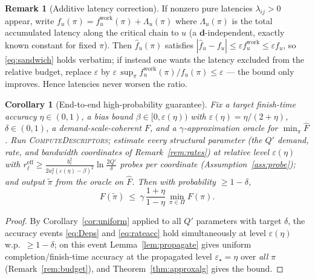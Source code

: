 \documentclass{amsart}
\newtheorem{corollary}{Corollary}
\theoremstyle{definition}
\newtheorem{remark}{Remark}
\begin{document}
\begin{remark}[Additive latency correction]\label{rem:latency}
If nonzero pure latencies $\lambda_{ij}>0$ appear, write
$f_u(\pi)=f_u^{\mathrm{work}}(\pi)+\Lambda_u(\pi)$ where $\Lambda_u(\pi)$ is the
total accumulated latency along the critical chain to $u$ (a
$\mathbf d$-independent, exactly known constant for fixed $\pi$). Then
$\widehat f_u(\pi)$ satisfies $|\widehat f_u-f_u|\le\varepsilon f_u^{\mathrm{work}}
\le\varepsilon f_u$, so \eqref{eq:sandwich} holds verbatim; if instead one wants
the latency excluded from the relative budget, replace $\varepsilon$ by
$\varepsilon\,\sup_\pi f_u^{\mathrm{work}}(\pi)/f_u(\pi)\le\varepsilon$ — the
bound only improves. Hence latencies never worsen the ratio.
\end{remark}

\begin{corollary}[End-to-end high-probability guarantee]\label{cor:e2e}
Fix a target finish-time accuracy $\eta\in(0,1)$, a bias bound
$\beta\in[0,\varepsilon(\eta))$ with $\varepsilon(\eta)=\eta/(2+\eta)$,
$\delta\in(0,1)$, a demand-scale-coherent $F$, and a $\gamma$-approximation
oracle for $\min_\pi\widehat F$. Run \textsc{ComputeDescriptors}; estimate every
structural parameter (the $Q'$ demand, rate, and bandwidth coordinates of
Remark~\ref{rem:rates}) at relative level $\varepsilon(\eta)$ with
$r_\ell^{\mathrm{eff}}\ge\frac{b_\ell^2}{2a_\ell^2(\varepsilon(\eta)-\beta)^2}\ln\frac{2Q'}{\delta}$
probes per coordinate (Assumption~\ref{ass:probe}); and output $\tilde\pi$ from
the oracle on $\widehat F$. Then with probability $\ge1-\delta$,
\[
F(\tilde\pi)\ \le\ \gamma\,\frac{1+\eta}{1-\eta}\,\min_{\pi\in\Pi}F(\pi).
\]
\end{corollary}

\begin{proof}
By Corollary~\ref{cor:uniform} applied to all $Q'$ parameters with target
$\delta$, the accuracy events \eqref{eq:Deps} and \eqref{eq:rateacc} hold
simultaneously at level $\varepsilon(\eta)$ w.p.\ $\ge1-\delta$; on this event
Lemma~\ref{lem:propagate} gives uniform completion/finish-time accuracy at the
propagated level $\varepsilon_\star=\eta$ over \emph{all} $\pi$
(Remark~\ref{rem:budget}), and Theorem~\ref{thm:approxalg} gives the bound.
\end{proof}
\end{document}

